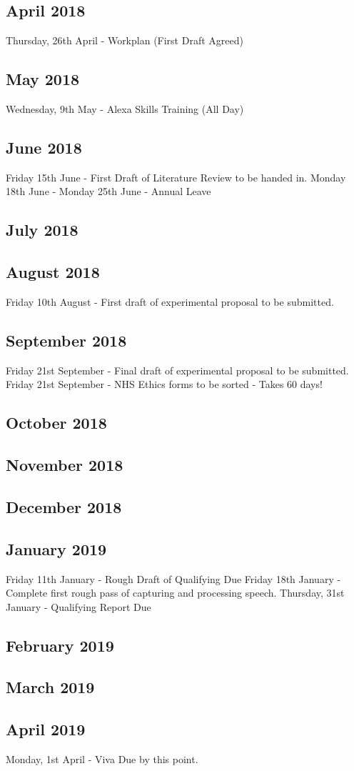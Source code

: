 \documentclass{article}
\begin{document}
	\subsection{April 2018}
	Thursday, 26th April - Workplan (First Draft Agreed)
	\subsection{May 2018}
	Wednesday, 9th May - Alexa Skills Training (All Day)
	\subsection{June 2018}
	Friday 15th June - First Draft of Literature Review to be handed in.
	\newline
	Monday 18th June - Monday 25th June - Annual Leave
	\subsection{July 2018}
	
	\subsection{August 2018}
	Friday 10th August - First draft of experimental proposal to be submitted.
	
	
	\subsection{September 2018}
	Friday 21st September - Final draft of experimental proposal to be submitted. 
	Friday 21st September - NHS Ethics forms to be sorted  - Takes 60 days!
	\subsection{October 2018}

	\subsection{November 2018}
	
	\subsection{December 2018}	
	
	\subsection{January 2019}
	Friday 11th January - Rough Draft of Qualifying Due
	Friday 18th January - Complete first rough pass of capturing and processing speech.
	Thursday, 31st January - Qualifying Report Due
	
	\subsection{February 2019}

	
	\subsection{March 2019}
	
	\subsection{April 2019}
	Monday, 1st April - Viva Due by this point.
\end{document}
